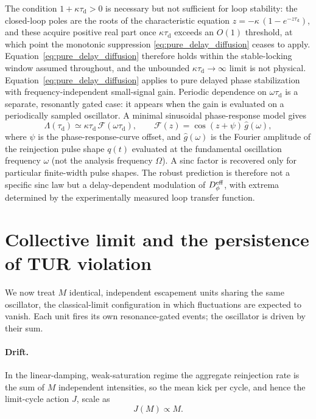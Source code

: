 \documentclass[aps,pre,reprint,amsmath,amssymb,floatfix,nofootinbib]{revtex4-2}
\newcommand{\Dphi}{D_{\phi}}
\newcommand{\taud}{\tau_{\mathrm{d}}}
\begin{document}
The condition $1+\kappa\taud>0$ is necessary but not sufficient for
loop stability: the closed-loop poles are the roots of the characteristic
equation $z=-\kappa\,(1-e^{-z\taud})$, and these acquire positive real
part once $\kappa\taud$ exceeds an $O(1)$ threshold, at which point the
monotonic suppression \eqref{eq:pure_delay_diffusion} ceases to apply.
Equation~\eqref{eq:pure_delay_diffusion} therefore holds within the
stable-locking window assumed throughout, and the unbounded
$\kappa\taud\to\infty$ limit is not physical.
Equation~\eqref{eq:pure_delay_diffusion} applies to pure delayed phase
stabilization with frequency-independent small-signal gain. Periodic
dependence on $\omega\taud$ is a separate, resonantly gated case: it appears
when the gain is evaluated on a periodically sampled oscillator. A minimal
sinusoidal phase-response model gives
\begin{equation}
  \Lambda(\taud)
  \simeq
  \kappa\taud\,\mathcal{F}(\omega\taud),
  \qquad
  \mathcal{F}(z)=\cos(z+\psi)\,\widehat g(\omega),
  \label{eq:delaydiff_sinusoidal}
\end{equation}
where $\psi$ is the phase-response-curve offset, and $\widehat g(\omega)$
is the Fourier amplitude of the reinjection pulse shape $q(t)$ evaluated
at the fundamental oscillation frequency $\omega$ (not the analysis
frequency $\Omega$). A sinc factor is recovered only for particular
finite-width pulse shapes. The robust prediction is therefore not a
specific sinc law but a delay-dependent modulation of $\Dphi^{\rm eff}$,
with extrema determined by the experimentally measured loop transfer
function.

\section{Collective limit and the persistence of TUR violation}
\label{sec:collective}

We now treat $M$ identical, independent escapement units sharing the same
oscillator, the classical-limit configuration in which fluctuations are
expected to vanish. Each unit fires its own resonance-gated events; the
oscillator is driven by their sum.

\paragraph*{Drift.}
In the linear-damping, weak-saturation regime the aggregate reinjection
rate is the sum of $M$ independent intensities, so the mean kick per
cycle, and hence the limit-cycle action $J$, scale as
\begin{equation}
  J(M) \propto M .
  \label{eq:action}
\end{equation}
\end{document}
